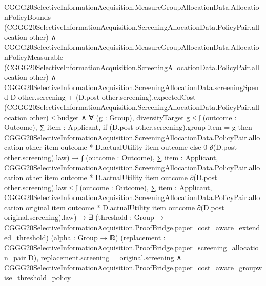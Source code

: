 \documentclass[10pt]{article}
\begin{document}
\begin{ReviewVerbatim}
                      CGGG20SelectiveInformationAcquisition.MeasureGroupAllocationData.AllocationPolicyBounds
                          (CGGG20SelectiveInformationAcquisition.ScreeningAllocationData.PolicyPair.allocation other) ∧
                        CGGG20SelectiveInformationAcquisition.MeasureGroupAllocationData.AllocationPolicyMeasurable
                            (CGGG20SelectiveInformationAcquisition.ScreeningAllocationData.PolicyPair.allocation
                              other) ∧
                          CGGG20SelectiveInformationAcquisition.ScreeningAllocationData.screeningSpend D
                                  other.screening +
                                (D.post other.screening).expectedCost
                                  (CGGG20SelectiveInformationAcquisition.ScreeningAllocationData.PolicyPair.allocation
                                    other) ≤
                              budget ∧
                            ∀ (g : Group),
                              diversityTarget g ≤
                                ∫ (outcome : Outcome),
                                  ∑ item : Applicant,
                                    if (D.post other.screening).group item = g then
                                      CGGG20SelectiveInformationAcquisition.ScreeningAllocationData.PolicyPair.allocation
                                          other item outcome *
                                        D.actualUtility item outcome
                                    else 0 ∂(D.post other.screening).law) →
                    ∫ (outcome : Outcome),
                        ∑ item : Applicant,
                          CGGG20SelectiveInformationAcquisition.ScreeningAllocationData.PolicyPair.allocation other item
                              outcome *
                            D.actualUtility item outcome ∂(D.post other.screening).law ≤
                      ∫ (outcome : Outcome),
                        ∑ item : Applicant,
                          CGGG20SelectiveInformationAcquisition.ScreeningAllocationData.PolicyPair.allocation original
                              item outcome *
                            D.actualUtility item outcome ∂(D.post original.screening).law) →
              ∃ (threshold :
                Group → CGGG20SelectiveInformationAcquisition.ProofBridge.paper_cost_aware_extended_threshold) (alpha :
                Group → ℝ) (replacement :
                CGGG20SelectiveInformationAcquisition.ProofBridge.paper_screening_allocation_pair D),
                replacement.screening = original.screening ∧
                  CGGG20SelectiveInformationAcquisition.ProofBridge.paper_cost_aware_groupwise_threshold_policy

\end{ReviewVerbatim}
\end{document}
